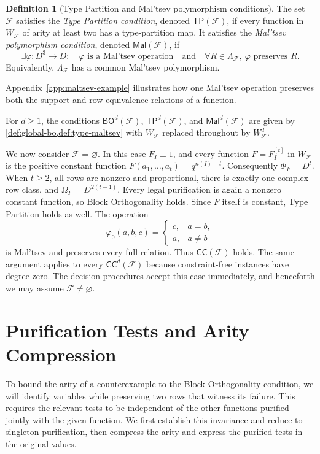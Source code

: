 \documentclass[11pt,letterpaper,onecolumn]{article}
\theoremstyle{plain}
\theoremstyle{definition}
\newtheorem{definition}[definition]{Definition}
\theoremstyle{remark}
\newcommand{\cF}{\mathcal F}
\newcommand{\CC}{\mathsf{CC}}
\newcommand{\BO}{\mathsf{BO}}
\newcommand{\TP}{\mathsf{TP}}
\newcommand{\Mal}{\mathsf{Mal}}
\newcommand{\WFdeg}[1]{W_{\cF}^{#1}}
\newcommand{\SuppRel}[1]{\Phi_{#1}}
\newcommand{\RowEq}[1]{\Omega_{#1}}
\begin{document}
\begin{definition}[Type Partition and Mal'tsev polymorphism conditions]
\label{def:type-maltsev}
The set $\cF$ satisfies the \emph{Type Partition condition}, denoted
$\TP(\cF)$, if every function in $W_{\cF}$ of arity at least two has a
type-partition map.  It satisfies the \emph{Mal'tsev polymorphism condition},
denoted $\Mal(\cF)$, if
\begin{equation*}
  \exists \varphi:D^3\to D:\quad
  \varphi\text{ is a Mal'tsev operation}\quad\text{and}\quad
  \forall R\in\Lambda_{\cF},\ \varphi\text{ preserves }R.
\end{equation*}
Equivalently, $\Lambda_{\cF}$ has a common Mal'tsev polymorphism.
\end{definition}

Appendix~\ref{app:maltsev-example} illustrates how one Mal'tsev operation
preserves both the support and row-equivalence relations of a function.

For $d\ge1$, the conditions $\BO^d(\cF)$, $\TP^d(\cF)$, and
$\Mal^d(\cF)$ are given by \cref{def:global-bo,def:type-maltsev}
with $W_{\cF}$ replaced throughout
by $\WFdeg{d}$.

We now consider $\cF=\varnothing$.  In this case
$F_I\equiv1$, and every function $F=F_I^{[t]}$ in $W_{\cF}$ is the positive
constant function $F(a_1,\ldots,a_t)=q^{n(I)-t}$. Consequently $\SuppRel F=D^t$.  When $t\ge2$, all rows are nonzero and
proportional, there is exactly one complex row class, and
$\RowEq F=D^{2(t-1)}$.  Every legal purification is again a nonzero constant
function, so Block Orthogonality holds. Since $F$ itself is constant, Type
Partition holds as well.  The operation
\[
  \varphi_0(a,b,c)=
  \begin{cases}
    c,&a=b,\\
    a,&a\ne b
  \end{cases}
\]
is Mal'tsev and preserves every full relation.  Thus $\CC(\cF)$ holds. The
same argument applies to every $\CC^d(\cF)$ because constraint-free
instances have degree zero.  The decision procedures accept this case
immediately, and henceforth we may assume $\cF\ne\varnothing$.

\section{Purification Tests and Arity Compression}
\label{sec:purification-compression}

To bound the arity of a counterexample to the Block Orthogonality
condition, we will identify variables while preserving two rows that
witness its failure.  This requires the relevant tests to be independent
of the other functions purified jointly with the given function.  We first
establish this invariance and reduce to singleton purification, then
compress the arity and express the purified tests in the original values.
\end{document}
